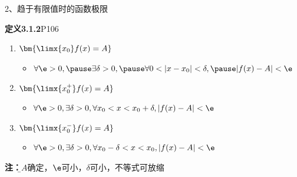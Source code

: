 \begin{frame}{2、趋于有限值时的函数极限}
	\linespread{1.2}\pause 
	\begin{block}{{\bf 定义3.1.2}\hfill P106}
		\begin{enumerate}
		  \item $\bm{\limx{x_0}f(x)=A}$\pause 
		  \begin{itemize}
		    \item $\forall\e>0,\pause \exists \delta>0,\pause \forall
		    0<|x-x_0|<\delta,\pause |f(x)-A|<\e$\pause 
		  \end{itemize}
		  \item $\bm{\limx{x_0^+}f(x)=A}$\pause 
		  \begin{itemize}
		    \item $\forall\e>0,\exists \delta>0,\forall
		    x_0<x<x_0+\delta,|f(x)-A|<\e$\pause 
		  \end{itemize}
		  \item $\bm{\limx{x_0^-}f(x)=A}$\pause 
		  \begin{itemize}
		    \item $\forall\e>0,\exists \delta>0,\forall x_0-\delta<x<x_0,|f(x)-A|<\e$
		  \end{itemize}
		\end{enumerate}
	\end{block}\pause 
	{\bf 注：}{\b $A$确定，$\e$可小，$\delta$可小，不等式可放缩}
\end{frame}

